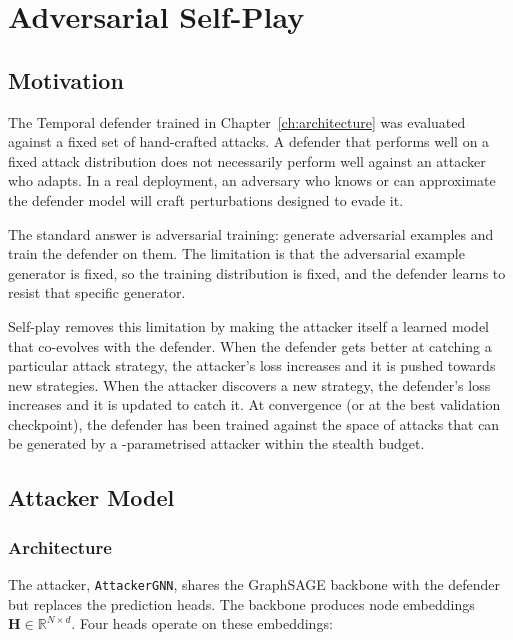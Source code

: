 \chapter{Adversarial Self-Play}
\label{ch:selfplay}

\section{Motivation}
\label{sec:selfplay_motivation}

The Temporal \moe{} defender trained in Chapter~\ref{ch:architecture}
was evaluated against a fixed set of hand-crafted attacks. A defender
that performs well on a fixed attack distribution does not necessarily
perform well against an attacker who adapts. In a real deployment,
an adversary who knows or can approximate the defender model will
craft perturbations designed to evade it.

The standard answer is adversarial training: generate adversarial
examples and train the defender on them. The limitation is that the
adversarial example generator is fixed, so the training distribution
is fixed, and the defender learns to resist that specific generator.

Self-play removes this limitation by making the attacker itself a
learned model that co-evolves with the defender. When the defender
gets better at catching a particular attack strategy, the attacker's
loss increases and it is pushed towards new strategies. When the
attacker discovers a new strategy, the defender's loss increases and
it is updated to catch it. At convergence (or at the best validation
checkpoint), the defender has been trained against the space of
attacks that can be generated by a \gnn{}-parametrised attacker
within the stealth budget.

\section{Attacker Model}
\label{sec:attacker_model}

\subsection{Architecture}

The attacker, \texttt{AttackerGNN}, shares the GraphSAGE
backbone with the defender but replaces the prediction heads. The
backbone produces node embeddings $\mathbf{H} \in \mathbb{R}^{N \times d}$.
Four heads operate on these embeddings:

